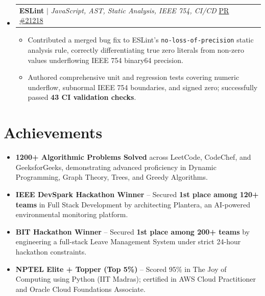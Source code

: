 \documentclass[letterpaper,10.5pt]{article}
\makeatletter
\newcommand{\resumeItem}[1]{
  \item\small{#1\vspace{-1pt}}
}
\newcommand{\resumeProjectHeading}[2]{
  \item
  \begin{tabular*}{0.97\textwidth}[t]{l@{\extracolsep{\fill}}r}
    \small#1 & #2 \\
  \end{tabular*}
  \vspace{1pt}
}
\newcommand{\resumeSubHeadingListStart}{
\begin{itemize}[
    leftmargin=0.15in,
    label={},
    itemsep=2pt,
    parsep=0pt,
    topsep=3pt,
    partopsep=0pt
]
}
\newcommand{\resumeSubHeadingListEnd}{
\end{itemize}
\vspace{-2pt}
}
\newcommand{\resumeItemListStart}{
\begin{itemize}[
    itemsep=1pt,
    parsep=0pt,
    topsep=1pt,
    partopsep=0pt,
    leftmargin=0.18in
]
}
\newcommand{\resumeItemListEnd}{
\end{itemize}
\vspace{-2pt}
}
\makeatother
\begin{document}
\resumeSubHeadingListStart

\resumeProjectHeading
{\textbf{ESLint} $|$ \emph{JavaScript, AST, Static Analysis, IEEE 754, CI/CD}
\hfill
\href{https://github.com/eslint/eslint/pull/21218}{PR \#21218}}{}

\resumeItemListStart

    \resumeItem{Contributed a merged bug fix to ESLint's \texttt{no-loss-of-precision} static analysis rule, correctly differentiating true zero literals from non-zero values underflowing IEEE 754 binary64 precision.}

    \resumeItem{Authored comprehensive unit and regression tests covering numeric underflow, subnormal IEEE 754 boundaries, and signed zero; successfully passed \textbf{43 CI validation checks}.}

\resumeItemListEnd

\resumeSubHeadingListEnd

\section{Achievements}

\resumeItemListStart

    \resumeItem{\textbf{1200+ Algorithmic Problems Solved} across LeetCode, CodeChef, and GeeksforGeeks, demonstrating advanced proficiency in Dynamic Programming, Graph Theory, Trees, and Greedy Algorithms.}

    \resumeItem{\textbf{IEEE DevSpark Hackathon Winner} -- Secured \textbf{1st place among 120+ teams} in Full Stack Development by architecting Plantera, an AI-powered environmental monitoring platform.}

    \resumeItem{\textbf{BIT Hackathon Winner} -- Secured \textbf{1st place among 200+ teams} by engineering a full-stack Leave Management System under strict 24-hour hackathon constraints.}

    \resumeItem{\textbf{NPTEL Elite + Topper (Top 5\%)} -- Scored 95\% in The Joy of Computing using Python (IIT Madras); certified in AWS Cloud Practitioner and Oracle Cloud Foundations Associate.}

\resumeItemListEnd

\end{document}
